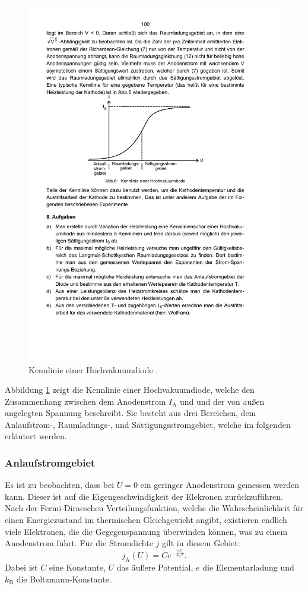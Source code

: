 \begin{figure}
  \centering
  \includegraphics[scale=0.8]{content/kennlinie.pdf}
\caption{Kennlinie einer Hochvakuumdiode \cite{anleitung504}.}
  \label{fig:kennlinie}
\end{figure}

Abbildung \ref{fig:kennlinie} zeigt die Kennlinie einer Hochvakuumdiode, welche den Zusammenhang zwischen dem Anodenstrom $I_\mathrm{A}$ und und der von außen angelegten Spannung beschreibt. Sie besteht aus drei Bereichen, dem Anlaufstrom-, Raumladungs-, und Sättigungsstromgebiet, welche im folgenden erläutert werden.

\subsubsection{Anlaufstromgebiet}
Es ist zu beobachten, dass bei $U=0$ ein geringer Anodenstrom gemessen werden kann. Dieser ist auf die Eigengeschwindigkeit der Elekronen zurückzuführen.
Nach der Fermi-Diracschen Verteilungsfunktion, welche die Wahrscheinlichkeit für einen Energiezustand im thermischen Gleichgewicht angibt, existieren endlich viele Elektronen, die die Gegegenspannung überwinden können, was zu einem Anodenstrom führt.
Für die Stromdichte $j$ gilt in diesem Gebiet:
\begin{equation}
  \label{eqn:anlauf}
  j_\mathrm{A}(U)=C e^{-\frac{e U}{k_\mathrm{B}T}}.
\end{equation}
Dabei ist $C$ eine Konstante, $U$ das äußere Potential, $e$ die Elementarladung und $k_\mathrm{B}$ die Boltzmann-Konstante.

